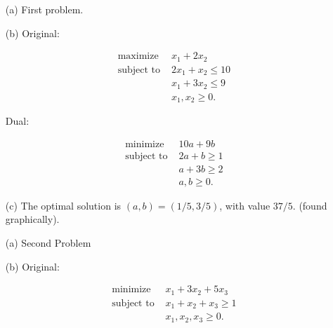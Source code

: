 \documentclass[11pt]{article}
\begin{document}
\begin{problems}

  \newpage 
  \problem  %

  \begin{enumerate}
  \item[(a)] First problem.
    
  \item[(b)] Original: 


    \begin{align*}
    \text{maximize } &x_1 + 2x_2\\
    \text{subject to } &2x_1 + x_2 \leq 10\\
    & x_1 + 3x_2 \leq 9\\
    & x_1, x_2 \geq 0.
    \end{align*}


    Dual:

    \begin{align*}
    \text{minimize } &10a + 9b\\
    \text{subject to } &2a + b \geq 1\\
    & a + 3b \geq 2\\
    &a, b \geq 0.
    \end{align*}

    \smallskip
    
  \item[(c)] %
    The optimal solution is $(a,b)=(1/5, 3/5)$, with value $37/5$. (found graphically).
  \end{enumerate}


  \medskip
  
  \problem  %

  \begin{enumerate}
  \item[(a)] Second Problem
    
  \item[(b)] Original: 


    \begin{align*}
    \text{minimize } &x_1 + 3x_2 + 5x_3\\
    \text{subject to } &x_1 + x_2 + x_3 \geq 1\\
    & x_1, x_2, x_3 \geq 0.
    \end{align*}



\end{enumerate}
\end{problems}
\end{document}
